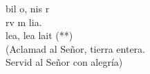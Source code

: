 \begin{cancion}%
	bil o, nis r\\
	rv m  lia.\\
	lea, lea  lait (**)\\
(Aclamad al Señor, tierra entera.\\
 Servid al Señor con alegría)\\
\end{cancion}%
